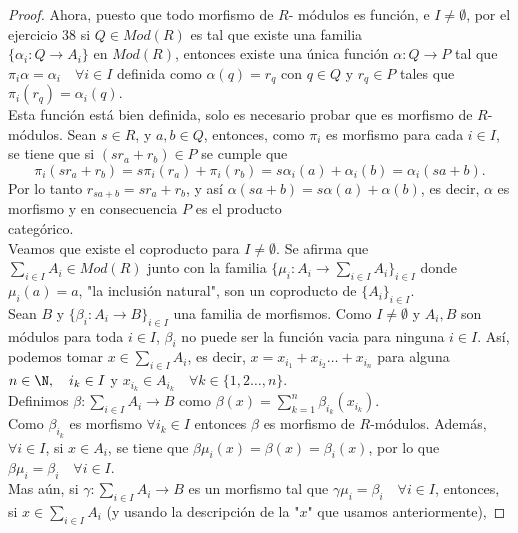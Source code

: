\documentclass{article}
\begin{document}
\begin{enumerate}[label=\textbf{Ej \arabic*.}]
\begin{proof}
Ahora, puesto que todo morfismo de $R$- módulos es función, e $I\neq \emptyset$, por el ejercicio 38 si $Q\in Mod(R)$ es tal que existe una familia\\
$\{\alpha_i:Q\to A_i\}$ en $Mod(R)$, entonces existe una única función $\alpha:Q\to P$ tal que $\pi_i\alpha=\alpha_i\quad \forall i\in I$ definida como 
$\alpha(q)=r_q$ con $q\in Q$ y $r_q\in P$ tales que $\pi_i(r_q)=\alpha_i(q).$\\

Esta función está bien definida, solo es necesario probar que es morfismo de $R$-módulos. Sean $s\in R$, y $a,b\in Q$, entonces, como $\pi_i$ es morfismo
para cada $i\in I$, se tiene que si $(s r_a+r_b)\in P$ se cumple que
\[\pi_i(sr_a+r_b)=s\pi_i(r_a)+\pi_i(r_b)=s\alpha_i(a)+\alpha_i(b)=\alpha_i(sa+b).
\]
Por lo tanto $r_{sa+b}=sr_a+r_b$, y así $\alpha(sa+b)=s\alpha(a)+\alpha(b)$, es decir, $\alpha$ es morfismo y en consecuencia $P$ es el producto\\
 categórico. \\

Veamos que existe el coproducto para $I\neq \emptyset$. Se afirma que \\$\displaystyle\sum_{i\in I}A_i\in Mod(R)$ junto con la familia
$\{\mu_i:A_i\to \displaystyle\sum_{i\in I}A_i\}_{i\in I}$ donde $\mu_i(a)=a$, "la inclusión natural", son un coproducto de $\{A_i\}_{i\in I}$.\\

Sean $B$ y $\{\beta_i:A_i\to B\}_{i\in I}$ una familia de morfismos. Como $I\neq \emptyset$ y $A_i,B$ son módulos para toda $i\in I$, 
$\beta_i$ no puede ser la función vacia para ninguna $i\in I$. Así, podemos tomar $x\in \displaystyle\sum_{i\in I}A_i$, es decir, 
$x=x_{i_1}+x_{i_2}\ldots +x_{i_n}$ para alguna $n\in \N,\quad i_k\in I$ y $x_{i_k}\in A_{i_k}\quad \forall k\in\{1,2\ldots,n\}$.\\

Definimos $\beta:\displaystyle\sum_{i\in I}A_i\longrightarrow B$ como $\beta(x)=\displaystyle\sum_{k=1}^n\beta_{i_k}(x_{i_k})$.\\

Como $\beta_{i_k}$ es morfismo $\forall i_k\in I$ entonces $\beta$ es morfismo de $R$-módulos. Además, $\forall i\in I$, si $x\in A_i$, se tiene que
$\beta\mu_i(x)=\beta(x)=\beta_i(x)$, por lo que $\beta\mu_i=\beta_i\quad \forall i\in I$.\\

Mas aún, si $\gamma:\displaystyle\sum_{i\in I}A_i\longrightarrow B$ es un morfismo tal que $\gamma\mu_i=\beta_i\quad \forall i\in I$, 
entonces, si $x\in \displaystyle\sum_{i\in I}A_i$ (y usando la descripción de la "$x$" que usamos anteriormente), 


\end{proof}
\end{enumerate}
\end{document}
